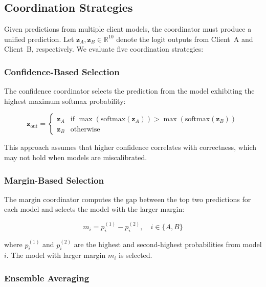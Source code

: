 \subsection{Coordination Strategies}
\label{subsec:coordinators}

Given predictions from multiple client models, the coordinator must produce a unified prediction. Let $\mathbf{z}_A, \mathbf{z}_B \in \mathbb{R}^{10}$ denote the logit outputs from Client~A and Client~B, respectively. We evaluate five coordination strategies:

\subsubsection{Confidence-Based Selection}

The confidence coordinator selects the prediction from the model exhibiting the highest maximum softmax probability:

\begin{equation}
\mathbf{z}_{\text{out}} = \begin{cases}
\mathbf{z}_A & \text{if } \max(\text{softmax}(\mathbf{z}_A)) > \max(\text{softmax}(\mathbf{z}_B)) \\
\mathbf{z}_B & \text{otherwise}
\end{cases}
\end{equation}

This approach assumes that higher confidence correlates with correctness, which may not hold when models are miscalibrated.

\subsubsection{Margin-Based Selection}

The margin coordinator computes the gap between the top two predictions for each model and selects the model with the larger margin:

\begin{equation}
m_i = p_i^{(1)} - p_i^{(2)}, \quad i \in \{A, B\}
\end{equation}

where $p_i^{(1)}$ and $p_i^{(2)}$ are the highest and second-highest probabilities from model $i$. The model with larger margin $m_i$ is selected.

\subsubsection{Ensemble Averaging}

